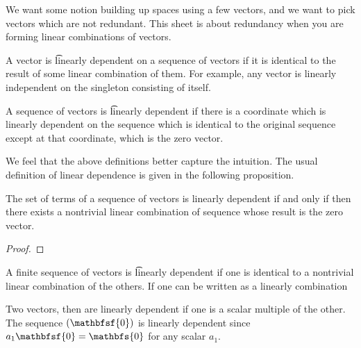 
\sbasic


























\sstart
{}


We want some notion building up spaces using a few vectors, and we want to pick vectors which are not redundant.
This sheet is about redundancy when you are forming linear combinations of vectors.



A vector is \t{linearly dependent} on a sequence of vectors if it is identical to the result of some linear combination of them.
For example, any vector is linearly independent on the singleton consisting of itself.

A sequence of vectors is \t{linearly dependent} if there is a coordinate which is linearly dependent on the sequence which is identical to the original sequence except at that coordinate, which is the zero vector.

We feel that the above definitions better capture the intuition.
The usual definition of linear dependence is given in the following proposition.
\begin{prop}
  The set of terms of a sequence of vectors is linearly dependent if and only if then there exists a nontrivial linear combination of sequence whose result is the zero vector.
  \begin{proof}

  \end{proof}

\end{prop}
A finite sequence of vectors is \t{linearly dependent} if one is identical to a nontrivial linear combination of the others.
If one can be written as a linearly combination

Two vectors, then are linearly dependent if one is a scalar multiple of the other.
The sequence $(\mathbfsf{0})$ is linearly dependent since $a_1 \mathbfsf{0} = \mathbfs{0}$ for any scalar $a_1$.

\strats
